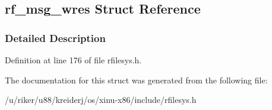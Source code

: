 \hypertarget{structrf__msg__wres}{}\subsection{rf\+\_\+msg\+\_\+wres Struct Reference}
\label{structrf__msg__wres}


\subsubsection{Detailed Description}


Definition at line 176 of file rfilesys.\+h.



The documentation for this struct was generated from the following file\+:\begin{DoxyCompactItemize}
\item 
/u/riker/u88/kreiderj/os/xinu-\/x86/include/rfilesys.\+h\end{DoxyCompactItemize}
